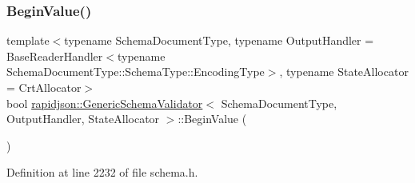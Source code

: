 \subsubsection{\texorpdfstring{BeginValue()}{BeginValue()}}
{\footnotesize\ttfamily template$<$typename Schema\+Document\+Type, typename Output\+Handler = Base\+Reader\+Handler$<$typename Schema\+Document\+Type\+::\+Schema\+Type\+::\+Encoding\+Type$>$, typename State\+Allocator = Crt\+Allocator$>$ \\
bool \mbox{\hyperlink{classrapidjson_1_1_generic_schema_validator}{rapidjson\+::\+Generic\+Schema\+Validator}}$<$ Schema\+Document\+Type, Output\+Handler, State\+Allocator $>$\+::Begin\+Value (\begin{DoxyParamCaption}{ }\end{DoxyParamCaption})\hspace{0.3cm}{\ttfamily [private]}}



Definition at line 2232 of file schema.\+h.


